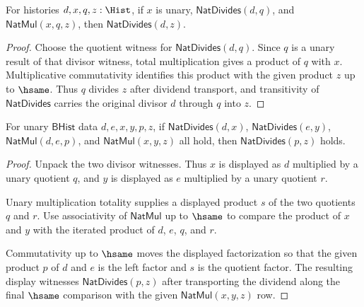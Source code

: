 \begin{theorem}
\label{thm:nat-divides-mul-left-closed}
For histories $d,x,q,z:\Hist$, if $x$ is unary,
$\mathsf{NatDivides}(d,q)$, and $\mathsf{NatMul}(x,q,z)$, then
$\mathsf{NatDivides}(d,z)$.
\end{theorem}
\begin{proof}
Choose the quotient witness for $\mathsf{NatDivides}(d,q)$. Since $q$ is a
unary result of that divisor witness, total multiplication gives a product of
$q$ with $x$. Multiplicative commutativity identifies this product with the
given product $z$ up to $\hsame$. Thus $q$ divides $z$ after dividend
transport, and transitivity of $\mathsf{NatDivides}$ carries the original
divisor $d$ through $q$ into $z$.
\end{proof}

\begin{theorem}
\label{thm:nat-divides-product-closed}
For unary $\mathsf{BHist}$ data $d,e,x,y,p,z$, if
$\mathsf{NatDivides}(d,x)$, $\mathsf{NatDivides}(e,y)$,
$\mathsf{NatMul}(d,e,p)$, and $\mathsf{NatMul}(x,y,z)$ all hold, then
$\mathsf{NatDivides}(p,z)$ holds.
\end{theorem}
\begin{proof}
Unpack the two divisor witnesses. Thus $x$ is displayed as $d$ multiplied by a
unary quotient $q$, and $y$ is displayed as $e$ multiplied by a unary quotient
$r$.

Unary multiplication totality supplies a displayed product $s$ of the two
quotients $q$ and $r$. Use associativity of $\mathsf{NatMul}$ up to $\hsame$ to
compare the product of $x$ and $y$ with the iterated product of $d$, $e$, $q$,
and $r$.

Commutativity up to $\hsame$ moves the displayed factorization so that the
given product $p$ of $d$ and $e$ is the left factor and $s$ is the quotient
factor. The resulting display witnesses $\mathsf{NatDivides}(p,z)$ after
transporting the dividend along the final $\hsame$ comparison with the given
$\mathsf{NatMul}(x,y,z)$ row.
\end{proof}

